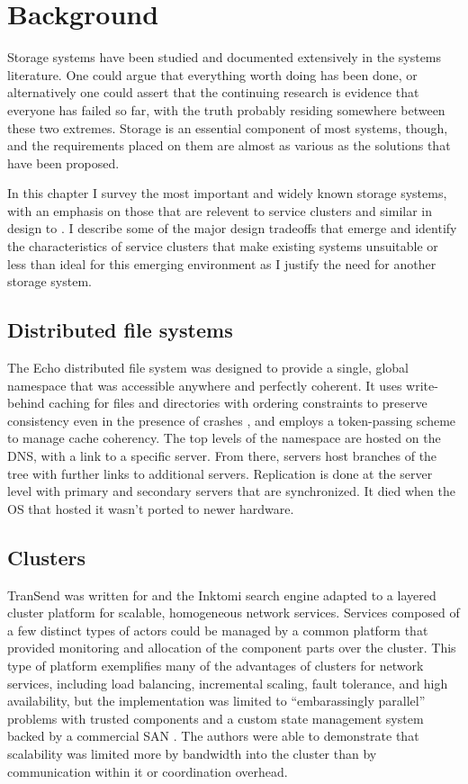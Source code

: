 \chapter{Background}

Storage systems have been studied and documented extensively in the systems literature. One could argue that everything worth doing has been done, or alternatively one could assert that the continuing research is evidence that everyone has failed so far, with the truth probably residing somewhere between these two extremes. Storage is an essential component of most systems, though, and the requirements placed on them are almost as various as the solutions that have been proposed.

In this chapter I survey the most important and widely known storage systems, with an emphasis on those that are relevent to service clusters and similar in design to \envoy. I describe some of the major design tradeoffs that emerge and identify the characteristics of service clusters that make existing systems unsuitable or less than ideal for this emerging environment as I justify the need for another storage system.

\section{Distributed file systems}

The Echo distributed file system \cite{birrell93} was designed to provide a single, global namespace that was accessible anywhere and perfectly coherent. It uses write-behind caching for files and directories with ordering constraints to preserve consistency even in the presence of crashes \cite{mann}, and employs a token-passing scheme to manage cache coherency. The top levels of the namespace are hosted on the DNS, with a link to a specific server. From there, servers host branches of the tree with further links to additional servers. Replication is done at the server level with primary and secondary servers that are synchronized. It died when the OS that hosted it wasn't ported to newer hardware.



\section{Clusters}

TranSend was written for and the Inktomi search engine adapted to a layered cluster platform for scalable, homogeneous network services. Services composed of a few distinct types of actors could be managed by a common platform that provided monitoring and allocation of the component parts over the cluster. This type of platform exemplifies many of the advantages of clusters for network services, including load balancing, incremental scaling, fault tolerance, and high availability, but the implementation was limited to ``embarassingly parallel'' problems with trusted components and a custom state management system backed by a commercial SAN \cite{fox}. The authors were able to demonstrate that scalability was limited more by bandwidth into the cluster than by communication within it or coordination overhead.